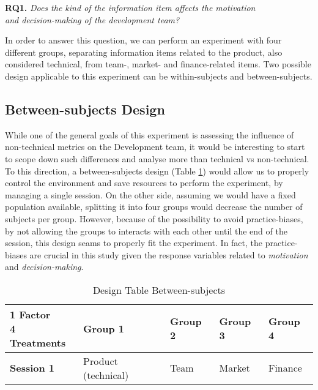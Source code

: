 \documentclass[runningheads]{llncs}
\begin{document}
\begin{center}
\textbf{RQ1.} \textit{Does the kind of the information item affects the motivation\\ and decision-making of the development team?}
\end{center}

In order to answer this question, we can perform an experiment with four different groups, separating information items related to the product, also considered technical, from team-, market- and finance-related items.
Two possible design applicable to this experiment can be within-subjects and between-subjects.

\subsection{Between-subjects Design}

While one of the general goals of this experiment is assessing the influence of non-technical metrics on the Development team, it would be interesting to start to scope down such differences and analyse more than technical vs non-technical. To this direction, a between-subjects design (Table \ref{tab2}) would allow us to properly control the environment and save resources to perform the experiment, by managing a single session. On the other side, assuming we would have a fixed population available, splitting it into four groups would decrease the number of subjects per group. However, because of the possibility to avoid practice-biases, by not allowing the groups to interacts with each other until the end of the session, this design seams to properly fit the experiment. In fact, the practice-biases are crucial in this study given the response variables related to \textit{motivation} and \textit{decision-making}.

\begin{table}
\caption{Design Table Between-subjects}\label{tab2}
\begin{center}
\begin{tabular}{p{3.7cm}|p{2cm}|p{2cm}|p{2cm}|p{2cm}}
\hline
\hline
\textbf{1 Factor\newline4 Treatments} & \textbf{Group 1} & \textbf{Group 2} & \textbf{Group 3} & \textbf{Group 4}\\
\hline
\textbf{Session 1} & Product (technical) & Team & Market & Finance\\
\hline
\hline
\end{tabular}
\end{center}
\end{table}
\end{document}
